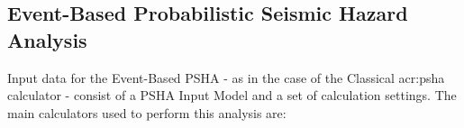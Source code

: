 \subsection{Event-Based Probabilistic Seismic Hazard Analysis}
\label{section:event-basedPSHA}
Input data for the Event-Based PSHA - as in the case of the 
Classical \gls{acr:psha} calculator - consist of a PSHA Input Model 
and a set of calculation settings.
%
The main calculators  used to perform this analysis are:
